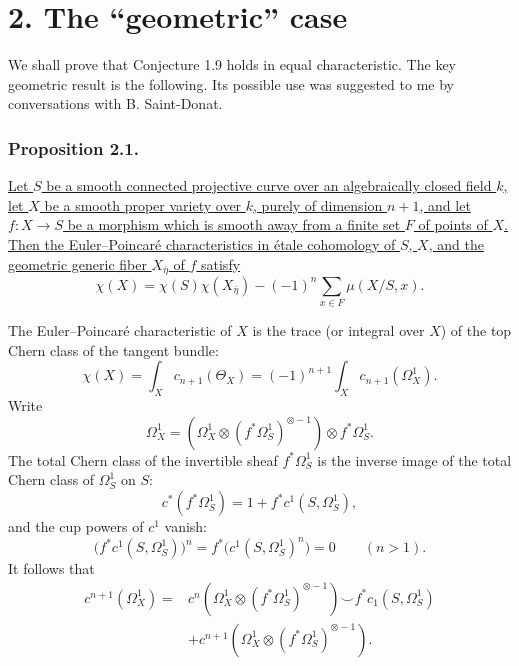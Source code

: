 \section*{2. The ``geometric'' case}

We shall prove that Conjecture 1.9 holds in equal characteristic.
The key geometric result is the following.  Its possible use was
suggested to me by conversations with B. Saint-Donat.

\subsubsection*{Proposition 2.1.}
\underline{Let $S$ be a smooth connected projective curve over an
algebraically closed field $k$, let $X$ be a smooth proper variety
over $k$, purely of dimension $n+1$, and let $f:X\to S$ be a
morphism which is smooth away from a finite set $F$ of points of
$X$.  Then the Euler--Poincar\'e characteristics in \'etale
cohomology of $S$, $X$, and the geometric generic fiber
$X_{\bar\eta}$ of $f$ satisfy}
\begin{equation}\tag{2.1.1}
\chi(X)=\chi(S)\chi(X_{\bar\eta})
-(-1)^n\sum_{x\in F}\mu(X/S,x).
\end{equation}

The Euler--Poincar\'e characteristic of $X$ is the trace (or integral
over $X$) of the top Chern class of the tangent bundle:
\[
\chi(X)=\int_Xc_{n+1}(\Theta_X)
=(-1)^{n+1}\int_Xc_{n+1}(\Omega_X^1).
\]
Write
\[
\Omega_X^1=\left(\Omega_X^1\otimes
(f^*\Omega_S^1)^{\otimes-1}\right)\otimes f^*\Omega_S^1.
\]
The total Chern class of the invertible sheaf $f^*\Omega_S^1$ is
the inverse image of the total Chern class of $\Omega_S^1$ on $S$:
\[
c^*(f^*\Omega_S^1)=1+f^*c^1(S,\Omega_S^1),
\]
and the cup powers of $c^1$ vanish:
\[
\bigl(f^*c^1(S,\Omega_S^1)\bigr)^n
=f^*\bigl(c^1(S,\Omega_S^1)^n\bigr)=0
\qquad(n>1).
\]
It follows that
\begin{align*}
c^{n+1}(\Omega_X^1)
={}&c^n\!\left(\Omega_X^1\otimes
(f^*\Omega_S^1)^{\otimes-1}\right)
\smile f^*c_1(S,\Omega_S^1)\\
&+c^{n+1}\!\left(\Omega_X^1\otimes
(f^*\Omega_S^1)^{\otimes-1}\right).
\end{align*}

